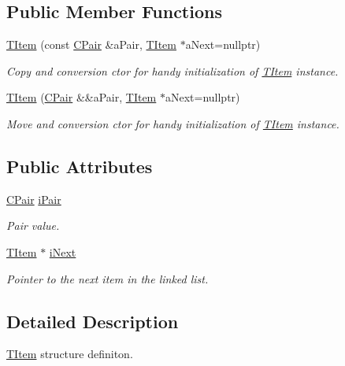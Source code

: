 \subsection*{Public Member Functions}
\begin{DoxyCompactItemize}
\item 
\hyperlink{struct_c_hash_map_1_1_t_item_a7dce7ef1ebf814b1f2e8abb22e6bbf3a}{T\+Item} (const \hyperlink{class_c_pair}{C\+Pair} \&a\+Pair, \hyperlink{struct_c_hash_map_1_1_t_item}{T\+Item} $\ast$a\+Next=nullptr)
\begin{DoxyCompactList}\small\item\em Copy and conversion c\textquotesingle{}tor for handy initialization of \hyperlink{struct_c_hash_map_1_1_t_item}{T\+Item} instance. \end{DoxyCompactList}\item 
\hyperlink{struct_c_hash_map_1_1_t_item_ab8e18615d2569ae7a1ff57ff982ceb7d}{T\+Item} (\hyperlink{class_c_pair}{C\+Pair} \&\&a\+Pair, \hyperlink{struct_c_hash_map_1_1_t_item}{T\+Item} $\ast$a\+Next=nullptr)
\begin{DoxyCompactList}\small\item\em Move and conversion c\textquotesingle{}tor for handy initialization of \hyperlink{struct_c_hash_map_1_1_t_item}{T\+Item} instance. \end{DoxyCompactList}\end{DoxyCompactItemize}
\subsection*{Public Attributes}
\begin{DoxyCompactItemize}
\item 
\hyperlink{class_c_pair}{C\+Pair} \hyperlink{struct_c_hash_map_1_1_t_item_a9b832f579f07c1011ef58d89a589470a}{i\+Pair}
\begin{DoxyCompactList}\small\item\em Pair value. \end{DoxyCompactList}\item 
\hyperlink{struct_c_hash_map_1_1_t_item}{T\+Item} $\ast$ \hyperlink{struct_c_hash_map_1_1_t_item_a7d4fed6cab5e5e567fddc934a8ace1f7}{i\+Next}
\begin{DoxyCompactList}\small\item\em Pointer to the next item in the linked list. \end{DoxyCompactList}\end{DoxyCompactItemize}


\subsection{Detailed Description}
\hyperlink{struct_c_hash_map_1_1_t_item}{T\+Item} structure definiton. 

